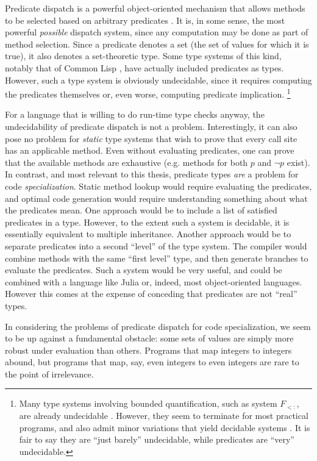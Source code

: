 Predicate dispatch is a powerful object-oriented mechanism that allows
methods to be selected based on arbitrary predicates \cite{ErnstKC98}.
It is, in some
sense, the most powerful \emph{possible} dispatch system, since any
computation may be done as part of method selection. Since a predicate
denotes a set (the set of values for which it is true), it also denotes
a set-theoretic type. Some type systems of this kind, notably that of
Common Lisp \cite{steele1990common:types}, have actually included predicates as types.
However, such a type system is obviously undecidable, since it
requires computing the predicates themselves or, even worse, computing
predicate implication.
\footnote{
Many type systems involving bounded quantification, such as system $F_{<:}$,
are already undecidable \cite{Pierce1994131}.
However, they seem to terminate for most practical programs, and also admit
minor variations that yield decidable systems \cite{Castagna:1994:DBQ:174675.177844}.
It is fair to say they are ``just barely'' undecidable, while predicates
are ``very'' undecidable.
}

For a language that is willing to do run-time type checks anyway, the
undecidability of predicate dispatch is not a problem.
Interestingly, it can also pose no problem for \emph{static} type systems
that wish to prove that every call site has an applicable method.
Even without evaluating predicates, one can prove that the available methods
are exhaustive (e.g. methods for both $p$ and $\neg p$ exist).
In contrast, and most relevant to this thesis, predicate types \emph{are} a
problem for code \emph{specialization}. Static method lookup would require
evaluating the predicates, and optimal code generation would require
understanding something about what the predicates mean. One approach would
be to include a list of satisfied predicates in a type. However, to the
extent such a system is decidable, it is essentially equivalent to multiple
inheritance. Another approach would be to separate predicates into a
second ``level'' of the type system. The compiler would combine methods
with the same ``first level'' type, and then generate branches to evaluate
the predicates. Such a system would be very useful, and could be
combined with a language like Julia or, indeed, most object-oriented
languages. However this comes at the expense of conceding that predicates
are not ``real'' types.

In considering the problems of predicate dispatch for code specialization,
we seem to be up against a fundamental obstacle: some sets of values are
simply more robust under evaluation than others. Programs that map integers
to integers abound, but programs that map, say, even integers to even
integers are rare to the point of irrelevance.


